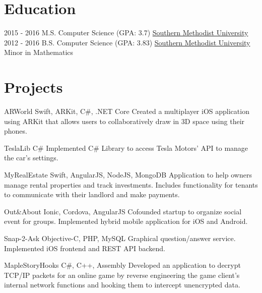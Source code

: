 \documentclass[letterpaper]{resume}
\begin{document}
\section{Education}
\begin{twenty} %
	\twentyitem
	{2015 - 2016}
	{}
	{M.S. Computer Science \textnormal{(GPA: 3.7)}}
	{\href{http://www.smu.edu/}{Southern Methodist University}}
	{}
	{}
	\twentyitem
	{2012 - 2016}
	{}
	{B.S. Computer Science \textnormal{(GPA: 3.83)}}
	{\href{http://www.smu.edu/}{Southern Methodist University}}
	{Minor in Mathematics}
	{}
\end{twenty}


\section{Projects}

\project
{ARWorld}
{Swift, ARKit, C\#, .NET Core}
{Created a multiplayer iOS application using ARKit that allows users to collaboratively draw in 3D space using their phones.}

\project
{TeslaLib}
{C\#}
{Implemented C\# Library to access Tesla Motors’ API to manage the car’s settings.}

\project
{MyRealEstate}
{Swift, AngularJS, NodeJS, MongoDB}
{Application to help owners manage rental properties and track investments. Includes functionality for tenants to communicate with their landlord and make payments.}

\project
{Out\&About}
{Ionic, Cordova, AngularJS}
{Cofounded startup to organize social event for groups. Implemented hybrid mobile application for iOS and Android.}

\project
{Snap-2-Ask}
{Objective-C, PHP, MySQL}
{Graphical question/answer service. Implemented iOS frontend and REST API backend.}

\project
{MapleStoryHooks}
{C\#, C++, Assembly}
{Developed an application to decrypt TCP/IP packets for an online game by reverse engineering the game client’s internal network functions and hooking them to intercept unencrypted data.}
		
\end{document}
